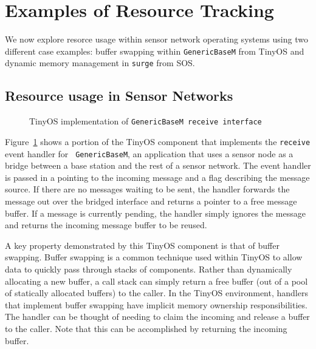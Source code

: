 \section{Examples of Resource Tracking}
\label{sec:example}

We now explore resorce usage within sensor network operating systems using two
different case examples: buffer swapping within {\tt GenericBaseM} from TinyOS
and dynamic memory management in {\tt surge} from SOS.

\subsection{Resource usage in Sensor Networks}

\smallskip{}

\begin{figure}[t]

\caption{TinyOS implementation of {\tt GenericBaseM receive
interface}\label{fig:genericbase}}
\end{figure}


Figure~\ref{fig:genericbase} shows a portion of the TinyOS component
that implements the {\tt receive} event handler for {\tt
GenericBaseM}, an application that uses a sensor node as a bridge
between a base station and the rest of a sensor network.  The
 event handler is passed in a 
pointing to the incoming message and a flag describing the message
source.  If there are no messages waiting to be sent, the handler
forwards the message out over the bridged interface and returns a
pointer to a free message buffer.  If a message is currently pending,
the handler simply ignores the message and returns the incoming
message buffer to be reused.

A key property demonstrated by this TinyOS component is that of buffer
swapping.  Buffer swapping is a common technique used within TinyOS to
allow data to quickly pass through stacks of components.  Rather than
dynamically allocating a new buffer, a call stack can simply return a
free buffer (out of a pool of statically allocated buffers) to the
caller.  In the TinyOS environment, handlers that implement buffer
swapping have implicit memory ownership responsibilities.  The handler
can be thought of needing to claim the incoming  and
release a buffer to the caller.  Note that this can be accomplished by
returning the incoming buffer.


\smallskip{}


